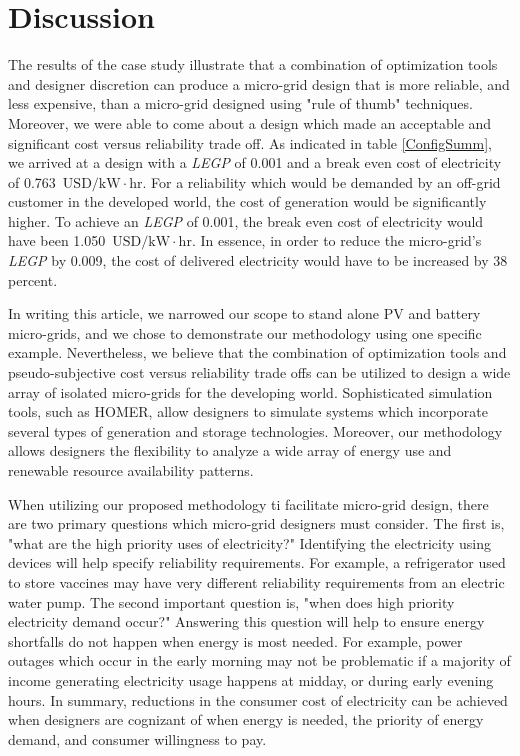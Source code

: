 \documentclass[11p]{article}
\newcommand{\unit}[1]{\ensuremath{\, \mathrm{#1}}}
\begin{document}
\section{Discussion} \label{Discussion}

The results of the case study illustrate that a combination of optimization tools and designer discretion can produce a micro-grid design that is more reliable, and less expensive, than a micro-grid designed using "rule of thumb" techniques. 
Moreover, we were able to come about a design which made an acceptable and significant cost versus reliability trade off.
As indicated in table \ref{ConfigSumm}, we arrived at a design with a \emph{LEGP} of 0.001 and a break even cost of electricity of 0.763 \unit{USD/kW \! \cdot \! hr}.   
For a reliability which would be demanded by an off-grid customer in the developed world, the cost of generation would be significantly higher. 
To achieve an \emph{LEGP} of 0.001, the break even cost of electricity would have been 1.050 \unit{USD/kW \! \cdot \! hr}.
In essence, in order to reduce the micro-grid's \emph{LEGP} by 0.009, the cost of delivered electricity would have to be increased by 38 percent.   

In writing this article, we narrowed our scope to stand alone PV and battery micro-grids, and we chose to demonstrate our methodology using one specific example. 
Nevertheless, we believe that the combination of optimization tools and pseudo-subjective cost versus reliability trade offs can be utilized to design a wide array of isolated micro-grids for the developing world. 
Sophisticated simulation tools, such as HOMER, allow designers to simulate systems which incorporate several types of generation and storage technologies. 
Moreover, our methodology allows designers the flexibility to analyze a wide array of energy use and renewable resource availability patterns.


When utilizing our proposed methodology ti facilitate micro-grid design, there are two primary questions which micro-grid designers must consider.
The first is, "what are the high priority uses of electricity?"
Identifying the electricity using devices will help specify reliability requirements.
For example, a refrigerator used to store vaccines may have very different reliability requirements from an electric water pump. 
The second important question is, "when does high priority electricity demand occur?"
Answering this question will help to ensure energy shortfalls do not happen when energy is most needed.
For example, power outages which occur in the early morning may not be problematic if a majority of income generating electricity usage happens at midday, or during early evening hours. 
In summary, reductions in the consumer cost of electricity can be achieved when designers are cognizant of when energy is needed, the priority of energy demand, and consumer willingness to pay. 
\end{document}

